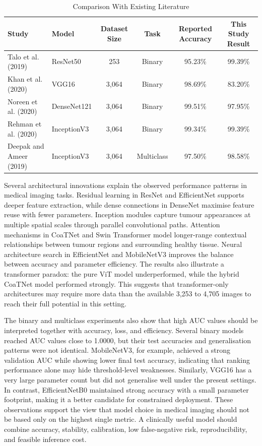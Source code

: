 \documentclass[final,3p,times,number]{elsarticle}
\begin{document}
\begin{table}[htbp]
\centering
\caption{Comparison With Existing Literature}
\label{tab:comparison-literature}
\scriptsize
\begin{tabularx}{\textwidth}{@{}YYcccc@{}}
\toprule
Study & Model & Dataset Size & Task & Reported Accuracy & This Study Result \\
\midrule
Talo et al. (2019) \cite{ref16} & ResNet50 & 253 & Binary & 95.23\% & 99.39\% \\
Khan et al. (2020) \cite{ref23} & VGG16 & 3,064 & Binary & 98.69\% & 83.20\% \\
Noreen et al. (2020) \cite{ref24} & DenseNet121 & 3,064 & Binary & 99.51\% & 97.95\% \\
Rehman et al. (2020) \cite{ref25} & InceptionV3 & 3,064 & Binary & 99.34\% & 99.39\% \\
Deepak and Ameer (2019) \cite{ref15} & InceptionV3 & 3,064 & Multiclass & 97.50\% & 98.58\% \\
\bottomrule
\end{tabularx}
\end{table}

Several architectural innovations explain the observed performance patterns in medical imaging tasks. Residual learning in ResNet and EfficientNet supports deeper feature extraction, while dense connections in DenseNet maximise feature reuse with fewer parameters. Inception modules capture tumour appearances at multiple spatial scales through parallel convolutional paths. Attention mechanisms in CoaTNet and Swin Transformer model longer-range contextual relationships between tumour regions and surrounding healthy tissue. Neural architecture search in EfficientNet and MobileNetV3 improves the balance between accuracy and parameter efficiency. The results also illustrate a transformer paradox: the pure ViT model underperformed, while the hybrid CoaTNet model performed strongly. This suggests that transformer-only architectures may require more data than the available 3,253 to 4,705 images to reach their full potential in this setting.

The binary and multiclass experiments also show that high AUC values should be interpreted together with accuracy, loss, and efficiency. Several binary models reached AUC values close to 1.0000, but their test accuracies and generalisation patterns were not identical. MobileNetV3, for example, achieved a strong validation AUC while showing lower final test accuracy, indicating that ranking performance alone may hide threshold-level weaknesses. Similarly, VGG16 has a very large parameter count but did not generalise well under the present settings. In contrast, EfficientNetB0 maintained strong accuracy with a small parameter footprint, making it a better candidate for constrained deployment. These observations support the view that model choice in medical imaging should not be based only on the highest single metric. A clinically useful model should combine accuracy, stability, calibration, low false-negative risk, reproducibility, and feasible inference cost.
\end{document}
